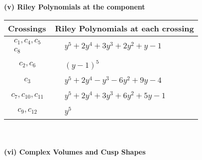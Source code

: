 \documentclass[1p]{elsarticle_modified}
\theoremstyle{definition}
\begin{document}
\newpage\renewcommand{\arraystretch}{1}
\flushleft \textbf{(v) Riley Polynomials at the component}\newline \\
\begin{tabular}{m{50pt}|m{274pt}}
Crossings & \hspace{64pt}Riley Polynomials at each crossing \\
\hline $$\begin{aligned}c_{1},c_{4},c_{5}\\c_{8}\end{aligned}$$&$\begin{aligned}
&y^5+2 y^4+3 y^3+2 y^2+y-1
\end{aligned}$\\
\hline $$\begin{aligned}c_{2},c_{6}\end{aligned}$$&$\begin{aligned}
&(y-1)^5
\end{aligned}$\\
\hline $$\begin{aligned}c_{3}\end{aligned}$$&$\begin{aligned}
&y^5+2 y^4- y^3-6 y^2+9 y-4
\end{aligned}$\\
\hline $$\begin{aligned}c_{7},c_{10},c_{11}\end{aligned}$$&$\begin{aligned}
&y^5+2 y^4+3 y^3+6 y^2+5 y-1
\end{aligned}$\\
\hline $$\begin{aligned}c_{9},c_{12}\end{aligned}$$&$\begin{aligned}
&y^5
\end{aligned}$\\
\hline
\end{tabular}\\~\\
\newpage\flushleft \textbf{(vi) Complex Volumes and Cusp Shapes}
\end{document}
